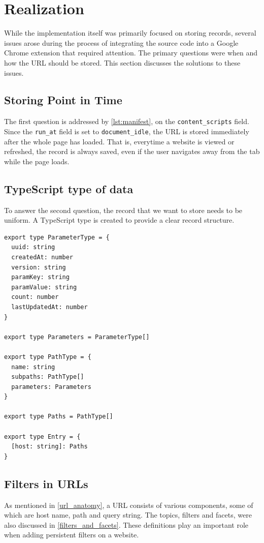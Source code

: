 \section{Realization}
While the implementation itself was primarily focused on storing records, several issues arose during the process of integrating the source code into a Google Chrome extension that required attention. The primary questions were when and how the URL should be stored. This section discusses the solutions to these issues.

\subsection*{Storing Point in Time}
The first question is addressed by \autoref{lst:manifest}, on the \verb;content_scripts; field. Since the \verb;run_at; field is set to \verb;document_idle;, the URL is stored immediately after the whole page has loaded. That is, everytime a website is viewed or refreshed, the record is always saved, even if the user navigates away from the tab while the page loads.

\subsection*{TypeScript type of data}
To answer the second question, the record that we want to store needs to be uniform. A TypeScript type is created to provide a clear record structure.

\begin{lstlisting}[style=es6, caption={TypeScript type of a record entry (TypeScript)}]
export type ParameterType = {
  uuid: string
  createdAt: number
  version: string
  paramKey: string
  paramValue: string
  count: number
  lastUpdatedAt: number
}

export type Parameters = ParameterType[]

export type PathType = {
  name: string
  subpaths: PathType[]
  parameters: Parameters
}

export type Paths = PathType[]

export type Entry = {
  [host: string]: Paths
}
\end{lstlisting}

\subsection*{Filters in URLs}
As mentioned in \autoref{url_anatomy}, a URL consists of various components, some of which are host name, path and query string. The topics, filters and facets, were also discussed in \autoref{filters_and_facets}. These definitions play an important role when adding persistent filters on a website.

